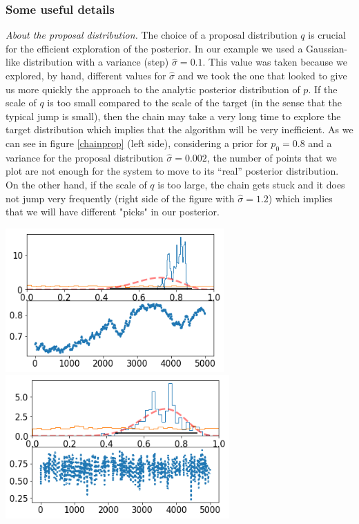 \documentclass[onecolumn,           %
               showpacs,            %
               preprintnumbers,     %
               aps,                 %
               letterpaper,             %
               superscriptaddress,      %
               nofootinbib,         %
               tightenlines,        %
               floats,floatfix      %
               ,usenatbib,
               ]{revtex4-1}
\begin{document}
\subsubsection{Some useful details}

\textit{About the proposal distribution.} The choice of a proposal distribution $q$ is crucial for the efficient exploration of the posterior. In our example we used a Gaussian-like distribution with a variance (step) $\hat\sigma=0.1$. This value was taken because we explored, by hand, different values for $\hat\sigma$ and we took the one that looked to give us more quickly the approach to the analytic posterior distribution of $p$. If the scale of $q$ is too small compared to the scale of the target (in the sense that the typical jump is small), then the chain may take a very long time to explore the target distribution which implies that the algorithm will be very inefficient. As we can see in figure \ref{chainprop} (left side), considering a prior for $p_0=0.8$ and a variance for the proposal distribution $\hat\sigma = 0.002$, the number of points that we plot are not enough for the system to move to its ``real'' posterior distribution. On the other hand, if the scale of $q$ is too large, the chain gets stuck and it does not jump very frequently (right side of the figure with $\hat\sigma = 1.2$) which implies that we will have different "picks" in our posterior.    

\begin{minipage}{\textwidth}
\centering
\includegraphics[height=5.5cm]{Figures/chain2.png}
\includegraphics[height=5.5cm]{Figures/chain3.png}
\label{chainprop}
\end{minipage}\\ $ $ \\
\end{document}

